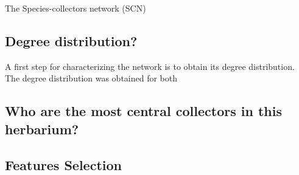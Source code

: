\documentclass[a4paper]{article}
\begin{document}


The Species-collectors network (SCN) 







\subsection{Degree distribution?}

A first step for characterizing the network is to obtain its degree distribution.
The degree distribution was obtained for both 


\subsection{Who are the most central collectors in this herbarium?}





\subsection{Features Selection}
\end{document}
